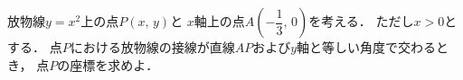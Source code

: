 \documentclass[../../main.tex]{subfiles}
\begin{document}
放物線$y=x^2$上の点$P(x, \, y)$と
$x$軸上の点$\displaystyle A \left( -\dfrac{1}{3}, \, 0 \right)$を考える．
ただし$x>0$とする．
点$P$における放物線の接線が直線$AP$および$y$軸と等しい角度で交わるとき，
点$P$の座標を求めよ．
\end{document}
